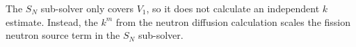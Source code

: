 The $S_N$ sub-solver only covers $V_1$, so it does not calculate an independent $k$
estimate. Instead, the $k^m$ from the neutron diffusion calculation scales the fission neutron
source term in the $S_N$ sub-solver.

%
%
%
